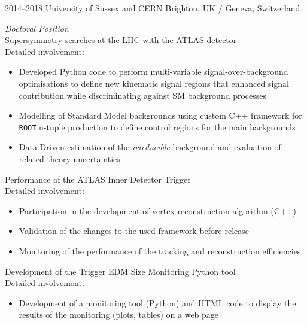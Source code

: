\documentclass[print]{cv} %
\begin{document}
  \begin{entrylist}
    \entry
    {2014--2018}
    {University of Sussex and CERN}
    {Brighton, UK / Geneva, Switzerland}
    {\emph{Doctoral Position} \\%
    Supersymmetry searches at the LHC with the ATLAS detector\\
    Detailed involvement: 
    \begin{itemize}
      \item Developed Python code to perform multi-variable signal-over-background optimisations to define new kinematic signal regions that enhanced signal contribution while discriminating against SM background processes
      \item Modelling of Standard Model backgrounds using custom C++ framework for \texttt{ROOT} n-tuple production to define control regions for the main backgrounds 
      \item Data-Driven estimation of the \emph{irreducible} background and evaluation of related theory uncertainties
    \end{itemize}\medskip
    Performance of the ATLAS Inner Detector Trigger\\
    Detailed involvement: 
    \begin{itemize}
      \item Participation in the development of vertex reconstruction algorithm (C++)
      \item Validation of the changes to the used framework before release
      \item Monitoring of the performance of the tracking and reconstruction efficiencies
    \end{itemize}\medskip
    Development of the Trigger EDM Size Monitoring Python tool\\
    Detailed involvement: 
    \begin{itemize}
      \item Development of a monitoring tool (Python) and HTML code to display the results of the monitoring (plots, tables) on a web page
    \end{itemize}      
    }
  \end{entrylist}
\end{document}
